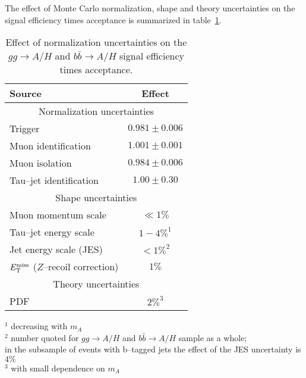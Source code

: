 The effect of Monte Carlo normalization, shape and theory uncertainties on the
signal efficiency times acceptance is summarized in
table~\ref{tab:ExpUncertainties}.

\begin{table}[t]
\begin{center}
\tablesize
\begin{tabular}{|l|c|}
\hline
Source & Effect \\
\hline
\hline
\multicolumn{2}{|c|}{Normalization uncertainties} \\
\hline
Trigger                         & $0.981 \pm 0.006$ \\
Muon identification             & $1.001 \pm 0.001$ \\
Muon isolation                  & $0.984 \pm 0.006$ \\
Tau--jet identification         & $1.00  \pm 0.30$ \\
\hline
\hline
\multicolumn{2}{|c|}{Shape uncertainties} \\
\hline
Muon momentum scale             & $\ll 1\%$ \\
Tau--jet energy scale           & $1 - 4\%^{1}$ \\
Jet energy scale (JES)          & $< 1\%^{2}$ \\
$E_{\mathrm{T}}^{\text{miss}}$ ($Z$--recoil correction) & $1\%$ \\
\hline
\hline
\multicolumn{2}{|c|}{Theory uncertainties} \\
\hline
PDF & $2\%^{3}$ \\
\hline
\end{tabular}
\end{center}
$^{1}$ decreasing with $m_{A}$ \\
$^{2}$ number quoted for $gg \to A/H$ and $b\bar{b} \to A/H$ sample as a whole; \\
\hspace{5mm} in the subsample of events with b--tagged jets the effect of the JES uncertainty is $4\%$ \\
$^{3}$ with small dependence on $m_{A}$ \\
\begin{center}
\caption[Effect of normalization uncertainties on signal efficiency times
acceptance]{\captiontext
         Effect of normalization uncertainties on the $gg \to A/H$ and $b\bar{b} \to A/H$ signal efficiency times acceptance.}
\label{tab:ExpUncertainties}
\end{center}
\end{table}
%
